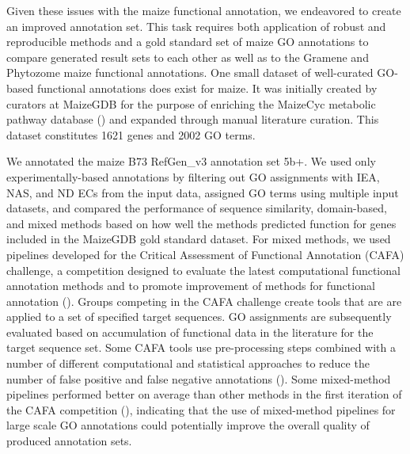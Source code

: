 Given these issues with the maize functional annotation, we endeavored to create an improved annotation set. This task requires both application of robust and reproducible methods and a gold standard set of maize GO annotations to compare generated result sets to each other as well as to the Gramene and Phytozome maize functional annotations. One small dataset of well-curated GO-based functional annotations does exist for maize. It was initially created by curators at MaizeGDB for the purpose of enriching the MaizeCyc metabolic pathway database (\cite{monaco_2013-GY}) and expanded through manual literature curation. This dataset constitutes \num{1621} genes and \num{2002} GO terms.

We annotated the maize B73 RefGen\_v3 annotation set 5b+. We used only experimentally-based annotations by filtering out GO assignments with IEA, NAS, and ND ECs from the input data, assigned GO terms using multiple input datasets, and compared the performance of sequence similarity, domain-based, and mixed methods based on how well the methods predicted function for genes included in the MaizeGDB gold standard dataset. For mixed methods, we used pipelines developed for the Critical Assessment of Functional Annotation (CAFA) challenge, a competition designed to evaluate the latest computational functional annotation methods and to promote improvement of  methods for functional annotation (\cite{radivojac_2013-YN, jiang_2016-be}). Groups competing in the CAFA challenge create tools that are are applied to a set of specified target sequences. GO assignments are subsequently evaluated based on accumulation of functional data in the literature for the target sequence set. Some CAFA tools use pre-processing steps combined with a number of different computational and statistical approaches to reduce the number of false positive and false negative annotations (\cite{clark_2011--Z,koskinen_2015-sl,falda_2012-VX}). Some mixed-method pipelines performed better on average than other methods in the first iteration of the CAFA competition (\cite{radivojac_2013-YN}), indicating that the use of mixed-method pipelines for large scale GO annotations could potentially improve the overall quality of produced annotation sets.

